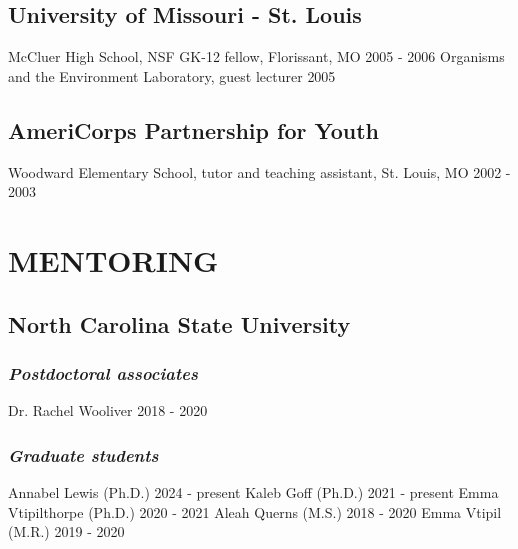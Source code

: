 \documentclass[11pt,english]{article}\usepackage[]{graphicx}\usepackage[]{xcolor}
\begin{document}
\subsection*{University of Missouri - St. Louis}
McCluer High School, NSF GK-12 fellow, Florissant, MO \hfill {2005 - 2006} \newline
Organisms and the Environment Laboratory, guest lecturer \hfill {2005} 

\subsection*{AmeriCorps Partnership for Youth}
Woodward Elementary School, tutor and teaching assistant, St. Louis, MO \hfill {2002 - 2003} 

\section*{MENTORING}


\subsection*{North Carolina State University}

\subsubsection*{\emph{Postdoctoral associates}}
Dr. Rachel Wooliver \hfill {2018 - 2020}

\subsubsection*{\emph{Graduate students}}
Annabel Lewis (Ph.D.) \hfill {2024 - present} \newline
Kaleb Goff (Ph.D.) \hfill {2021 - present} \newline
Emma Vtipilthorpe (Ph.D.) \hfill {2020 - 2021} \newline
Aleah Querns (M.S.) \hfill {2018 - 2020} \newline
Emma Vtipil (M.R.) \hfill {2019 - 2020}
\end{document}
